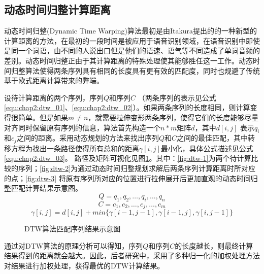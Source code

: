 \subsection{动态时间归整计算距离}
动态时间归整(Dynamic Time Warping)算法最初是由Itakura提出的的一种新型的计算距离的方法，在最初的一段时间是被应用于语音识别领域，在语音识别中即使是同一个词语，由不同的人说出口但是他们的语速、语气等不同造成了单词音频的差别。动态时间归整正由于其计算距离的特殊处理使其能够胜任这一工作。动态时间归整算法使得两条序列具有相同的长度具有更有效的匹配度，同时也规避了传统基于欧式距离计算带来的弊端。
\par 设待计算距离的两个序列，序列$Q$和序列$C$ （两条序列的表示见公式\ref{equ:chap2:dtw_01}、\ref{equ:chap2:dtw_02}）。如果两条序列的长度相同，则计算变得很简单。但是如果$m \neq n$，就需要拉伸变形两条序列，使得它们的长度能够尽量对齐同时保留原有序列的信息，算法首先构造一个$n \ast m$矩阵$d$，其中$d[i,j]$ 表示$q_{i}$ 和$c_{j}$之间的距离。采用动态规划的方法来找出序列$Q$和$C$之间的最佳匹配，其中转移方程为找出一条路径使得所有总和的距离$\gamma[i,j]$最小化，具体公式描述见公式\ref{equ:chap2:dtw_03}。
路径及矩阵可视化见图\ref{fig:2_5}。其中：\ref{fig:dtw-1}为两个待计算比较的序列；\ref{fig:dtw-2}为通过动态时间归整规划求解后两条序列计算距离时所对应的点；\ref{fig:dtw-3} 将原有序列所对应的位置进行拉伸展开后更加直观的动态时间归整匹配计算结果示意图。
\begin{equation}
\label{equ:chap2:dtw_01}
Q=q_{1},q_{2},…,q_{i},…,q_{n}
\end{equation}
\begin{equation}
\label{equ:chap2:dtw_02}
C=c_{1},c_{2},…,c_{j},…,c_{m}
\end{equation}
\begin{equation}
\label{equ:chap2:dtw_03}
\gamma[i,j]=d[i,j]+min\{\gamma[i-1,j-1],\gamma[i-1,j],\gamma[i,j-1]\}
\end{equation}
\begin{figure}[htb]
  \centering%
  \hspace{2em}%
  \hspace{2em}
  \caption{DTW算法匹配序列结果示意图}
  \label{fig:2_5}
\end{figure}
\par 通过对DTW算法的原理分析可以得知，序列$Q$和序列$C$的长度越长，则最终计算结果得到的距离就会越大。因此，后者研究中，采用了多种归一化的加权处理方法对结果进行加权处理\cite{ratanamahatana2004everything}，获得最优的DTW计算结果。

